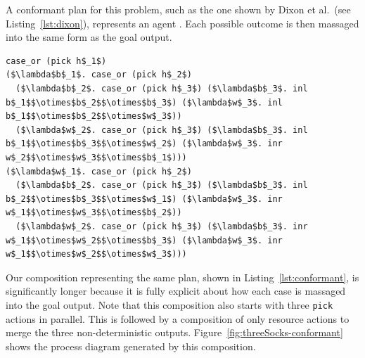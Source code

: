 \documentclass[class=smolathesis,crop=false]{standalone}
\begin{document}
A conformant plan for this problem, such as the one shown by Dixon et al.~(see Listing~\ref{lst:dixon}), represents an agent .
Each possible outcome is then massaged into the same form as the goal output.

\cbstart
\begin{lstlisting}[label=lst:dixon,caption=Conformant plan shown by Dixon et al.,basicstyle=\footnotesize\ttfamily,columns=flexible,breaklines=true,mathescape=true]
case_or (pick h$_1$)
($\lambda$b$_1$. case_or (pick h$_2$)
  ($\lambda$b$_2$. case_or (pick h$_3$) ($\lambda$b$_3$. inl b$_1$$\otimes$b$_2$$\otimes$b$_3$) ($\lambda$w$_3$. inl b$_1$$\otimes$b$_2$$\otimes$w$_3$))
  ($\lambda$w$_2$. case_or (pick h$_3$) ($\lambda$b$_3$. inl b$_1$$\otimes$b$_3$$\otimes$w$_2$) ($\lambda$w$_3$. inr w$_2$$\otimes$w$_3$$\otimes$b$_1$)))
($\lambda$w$_1$. case_or (pick h$_2$)
  ($\lambda$b$_2$. case_or (pick h$_3$) ($\lambda$b$_3$. inl b$_2$$\otimes$b$_3$$\otimes$w$_1$) ($\lambda$w$_3$. inr w$_1$$\otimes$w$_3$$\otimes$b$_2$))
  ($\lambda$w$_2$. case_or (pick h$_3$) ($\lambda$b$_3$. inr w$_1$$\otimes$w$_2$$\otimes$b$_3$) ($\lambda$w$_3$. inr w$_1$$\otimes$w$_2$$\otimes$w$_3$)))
\end{lstlisting}

Our composition representing the same plan, shown in Listing~\ref{lst:conformant}, is significantly longer because it is fully explicit about how each case is massaged into the goal output.
Note that this composition also starts with three \lstinline{pick} actions in parallel.
This is followed by a composition of only resource actions to merge the three non-deterministic outputs.
Figure~\ref{fig:threeSocks-conformant} shows the process diagram generated by this composition.
\end{document}
